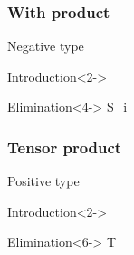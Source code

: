 \documentclass{beamer}
\begin{document}
  \begin{frame}
    \frametitle{With product}
    \begin{block}{}
      Negative type
    \end{block}
    \begin{block}{Introduction}<2->
                {\alert<3>{\ctx{\Gamma}{\Delta}} \vdash {} \ni {}}
    \end{block}
    \begin{block}{Elimination}<4->
                {\alert<5>{\ctx{\Gamma}{\Delta}} \vdash {} \in S_i}
    \end{block}
  \end{frame}
  \begin{frame}
    \frametitle{Tensor product}
    \begin{block}{}
      Positive type
    \end{block}
    \begin{block}{Introduction}<2->
                {\alert<5>{\ctx{\Gamma}{\Delta}} \vdash {} \ni {}}
    \end{block}
    \begin{block}{Elimination}<6->
                {\alert<10>{\ctx{\Gamma}{\Delta}} \vdash {} \in T}
    \end{block}
  \end{frame}
\end{document}
